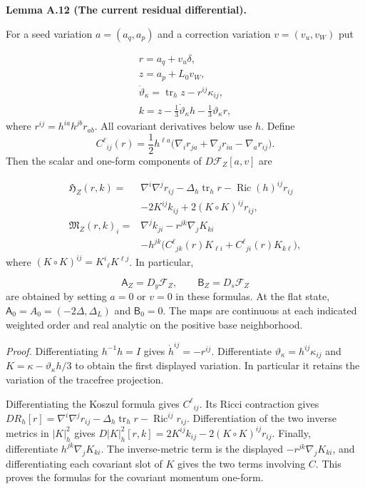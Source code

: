 \documentclass[
  english,
  11pt,
  reqno]{amsart}
\makeatletter
\newcommand{\pandocstatementheading}[1]{%
  \par\addpenalty{\@beginparpenalty}%
  \addvspace{.5\baselineskip plus .2\baselineskip minus .2\baselineskip}%
  {\normalfont\bfseries #1\par}%
  \nobreak\@afterindenttrue\@afterheading
}
\makeatother
\begin{document}
\pandocstatementheading{\leavevmode{}\label{lem:online-current-residual-differential}Lemma A.12 (The current residual differential).}

For a seed variation \(a=(a_q,a_p)\) and a correction variation
\(v=(v_u,v_W)\) put

\label{eq:online-current-tracefree-variation} \[
\begin{gathered}
r=a_q+v_u\delta, \\
z=a_p+L_0v_W, \\
\dot\vartheta_\kappa=\operatorname{tr}_h z-r^{ij}\kappa_{ij}, \\
k=z-\frac13\dot\vartheta_\kappa h-\frac13\vartheta_\kappa r,
\end{gathered}
\] where \(r^{ij}=h^{ia}h^{jb}r_{ab}\). All covariant derivatives below
use \(h\). Define \[
C^\ell{}_{ij}(r)=\frac12h^{\ell a}
\bigl(\nabla_i r_{ja}+\nabla_jr_{ia}-\nabla_ar_{ij}\bigr).
\] Then the scalar and one-form components of \(D\mathcal F_Z[a,v]\) are

\label{eq:online-current-explicit-linearized-residual} \[
\begin{aligned}
\mathfrak H_Z(r,k)
={}&\nabla^i\nabla^jr_{ij}
-\Delta_h\operatorname{tr}_hr
-\operatorname{Ric}(h)^{ij}r_{ij}\\
&-2K^{ij}k_{ij}
+2(K\circ K)^{ij}r_{ij},\\
\mathfrak M_Z(r,k)_i
={}&\nabla^jk_{ji}
-r^{jk}\nabla_jK_{ki}\\
&-h^{jk}\bigl(C^\ell{}_{jk}(r)K_{\ell i}
             +C^\ell{}_{ji}(r)K_{k\ell}\bigr),
\end{aligned}
\] where \((K\circ K)^{ij}=K^i{}_\ell K^{\ell j}\). In particular,

\label{eq:online-current-transverse-and-seed-derivatives}
\[
\mathsf A_Z=D_y\mathcal F_Z,\qquad
\mathsf B_Z=D_s\mathcal F_Z
\] are obtained by setting \(a=0\) or \(v=0\) in these formulas. At the
flat state, \(\mathsf A_0=A_0=(-2\Delta,\Delta_L)\) and
\(\mathsf B_0=0\). The maps are continuous at each indicated weighted
order and real analytic on the positive base neighborhood.

\emph{Proof.} Differentiating \(h^{-1}h=I\) gives
\(\dot h^{ij}=-r^{ij}\). Differentiate
\(\vartheta_\kappa=h^{ij}\kappa_{ij}\) and
\(K=\kappa-\vartheta_\kappa h/3\) to obtain the first displayed
variation. In particular it retains the variation of the tracefree
projection.

Differentiating the Koszul formula gives \(C^\ell{}_{ij}\). Its Ricci
contraction gives
\(DR_h[r]=\nabla^i\nabla^jr_{ij}-\Delta_h\operatorname{tr}_hr-\operatorname{Ric}^{ij}r_{ij}\).
Differentiation of the two inverse metrics in \(|K|_h^2\) gives
\(D|K|_h^2[r,k]=2K^{ij}k_{ij}-2(K\circ K)^{ij}r_{ij}\). Finally,
differentiate \(h^{jk}\nabla_jK_{ki}\). The inverse-metric term is the
displayed \(-r^{jk}\nabla_jK_{ki}\), and differentiating each covariant
slot of \(K\) gives the two terms involving \(C\). This proves the
formulas for the covariant momentum one-form.
\end{document}
